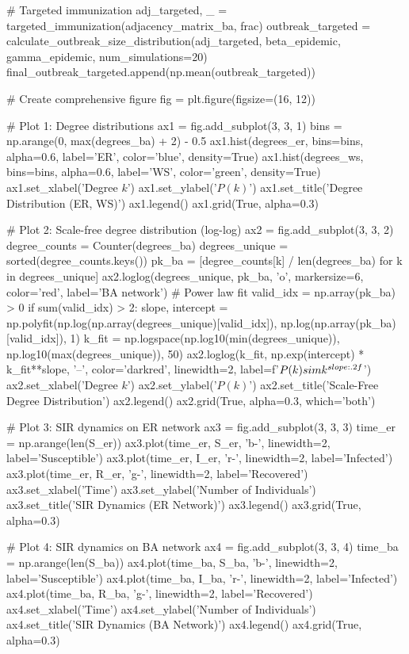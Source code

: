 \documentclass[a4paper, 11pt]{article}
\begin{document}
\begin{pycode}
    # Targeted immunization
    adj_targeted, _ = targeted_immunization(adjacency_matrix_ba, frac)
    outbreak_targeted = calculate_outbreak_size_distribution(adj_targeted, beta_epidemic, gamma_epidemic, num_simulations=20)
    final_outbreak_targeted.append(np.mean(outbreak_targeted))

# Create comprehensive figure
fig = plt.figure(figsize=(16, 12))

# Plot 1: Degree distributions
ax1 = fig.add_subplot(3, 3, 1)
bins = np.arange(0, max(degrees_ba) + 2) - 0.5
ax1.hist(degrees_er, bins=bins, alpha=0.6, label='ER', color='blue', density=True)
ax1.hist(degrees_ws, bins=bins, alpha=0.6, label='WS', color='green', density=True)
ax1.set_xlabel('Degree $k$')
ax1.set_ylabel('$P(k)$')
ax1.set_title('Degree Distribution (ER, WS)')
ax1.legend()
ax1.grid(True, alpha=0.3)

# Plot 2: Scale-free degree distribution (log-log)
ax2 = fig.add_subplot(3, 3, 2)
degree_counts = Counter(degrees_ba)
degrees_unique = sorted(degree_counts.keys())
pk_ba = [degree_counts[k] / len(degrees_ba) for k in degrees_unique]
ax2.loglog(degrees_unique, pk_ba, 'o', markersize=6, color='red', label='BA network')
# Power law fit
valid_idx = np.array(pk_ba) > 0
if sum(valid_idx) > 2:
    slope, intercept = np.polyfit(np.log(np.array(degrees_unique)[valid_idx]),
                                  np.log(np.array(pk_ba)[valid_idx]), 1)
    k_fit = np.logspace(np.log10(min(degrees_unique)), np.log10(max(degrees_unique)), 50)
    ax2.loglog(k_fit, np.exp(intercept) * k_fit**slope, '--', color='darkred',
               linewidth=2, label=f'$P(k) \\sim k^{{{slope:.2f}}}$')
ax2.set_xlabel('Degree $k$')
ax2.set_ylabel('$P(k)$')
ax2.set_title('Scale-Free Degree Distribution')
ax2.legend()
ax2.grid(True, alpha=0.3, which='both')

# Plot 3: SIR dynamics on ER network
ax3 = fig.add_subplot(3, 3, 3)
time_er = np.arange(len(S_er))
ax3.plot(time_er, S_er, 'b-', linewidth=2, label='Susceptible')
ax3.plot(time_er, I_er, 'r-', linewidth=2, label='Infected')
ax3.plot(time_er, R_er, 'g-', linewidth=2, label='Recovered')
ax3.set_xlabel('Time')
ax3.set_ylabel('Number of Individuals')
ax3.set_title('SIR Dynamics (ER Network)')
ax3.legend()
ax3.grid(True, alpha=0.3)

# Plot 4: SIR dynamics on BA network
ax4 = fig.add_subplot(3, 3, 4)
time_ba = np.arange(len(S_ba))
ax4.plot(time_ba, S_ba, 'b-', linewidth=2, label='Susceptible')
ax4.plot(time_ba, I_ba, 'r-', linewidth=2, label='Infected')
ax4.plot(time_ba, R_ba, 'g-', linewidth=2, label='Recovered')
ax4.set_xlabel('Time')
ax4.set_ylabel('Number of Individuals')
ax4.set_title('SIR Dynamics (BA Network)')
ax4.legend()
ax4.grid(True, alpha=0.3)


\end{pycode}
\end{document}
